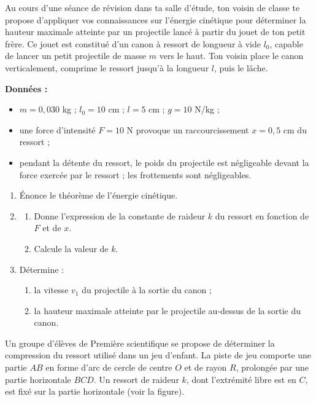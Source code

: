 Au cours d'une séance de révision dans ta salle d'étude, ton voisin de classe te propose
d'appliquer vos connaissances sur l'énergie cinétique pour déterminer la hauteur maximale atteinte
par un projectile lancé à partir du jouet de ton petit frère. Ce jouet est constitué d'un canon à
ressort de longueur à vide $l_0$, capable de lancer un petit projectile de masse $m$ vers le haut.
Ton voisin place le canon verticalement, comprime le ressort jusqu'à la longueur $l$, puis le lâche.

\textbf{Données :}
\begin{itemize}
  \item $m = 0,030$ kg ; $l_0 = 10$ cm ; $l = 5$ cm ; $g = 10$ N/kg ;
  \item une force d'intensité $F = 10$ N provoque un raccourcissement $x = 0,5$ cm du ressort ;
  \item pendant la détente du ressort, le poids du projectile est négligeable devant la force
        exercée par le ressort ; les frottements sont négligeables.
\end{itemize}
\begin{enumerate}
  \item Énonce le théorème de l'énergie cinétique.
  \item
  \begin{enumerate}[label=2.\arabic*.]
    \item Donne l'expression de la constante de raideur $k$ du ressort en fonction de $F$ et de $x$.
    \item Calcule la valeur de $k$.
  \end{enumerate}
  \item Détermine :
  \begin{enumerate}[label=3.\arabic*.]
    \item la vitesse $v_1$ du projectile à la sortie du canon ;
    \item la hauteur maximale atteinte par le projectile au-dessus de la sortie du canon.
  \end{enumerate}
\end{enumerate}

Un groupe d'élèves de Première scientifique se propose de déterminer la compression du ressort
utilisé dans un jeu d'enfant. La piste de jeu comporte une partie $AB$ en forme d'arc de cercle de
centre $O$ et de rayon $R$, prolongée par une partie horizontale $BCD$. Un ressort de raideur $k$,
dont l'extrémité libre est en $C$, est fixé sur la partie horizontale (voir la figure).


